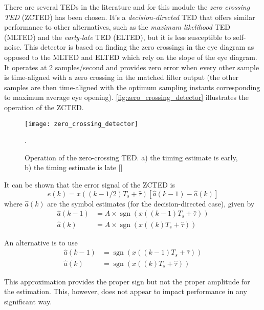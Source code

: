 There are several TEDs in the literature and for this module the \emph{zero crossing TED} (ZCTED) has been chosen. It's a \emph{decision-directed} TED that offers similar performance to other alternatives, such as the \emph{maximum likelihood} TED (MLTED) and the \emph{early-late} TED (ELTED), but it is less susceptible to self-noise. This detector is based on finding the zero crossings in the eye diagram as opposed to the MLTED and ELTED which rely on the slope of the eye diagram. It operates at 2 samples/second and provides zero error when every other sample is time-aligned with a zero crossing in the matched filter output (the other samples are then time-aligned with the optimum sampling instants corresponding to maximum average eye opening). \autoref{fig:zero_crossing_detector} illustrates the operation of the ZCTED.

\begin{figure}[ht]
  \centering
  \texttt{[image: zero\_crossing\_detector]}
  \caption{Operation of the zero-crossing TED. a) the timing estimate is early, b) the timing estimate is late [\citeauthor{digcomm_discrete_approach}]}.
  \label{fig:zero_crossing_detector}
\end{figure}

It can be shown \cite{digcomm_discrete_approach} that the error signal of the ZCTED is
\begin{equation}
e(k) = x\left(\left(k-1/2\right)T_s+\hat\tau\right)\left[\hat a\left(k-1\right)-\hat a\left(k\right)\right]
\end{equation}
where $\hat a(k)$ are the symbol estimates (for the decision-directed case), given by
\begin{align}
\hat a(k-1) &= A\times\operatorname{sgn}\left(x\left(\left(k-1\right)T_s + \hat\tau\right)\right)\\
\hat a(k)   &= A\times\operatorname{sgn}\left(x\left(\left(k\right)T_s + \hat\tau\right)\right)
\end{align}

An alternative is to use
\begin{align}
\hat a(k-1) &= \operatorname{sgn}\left(x\left(\left(k-1\right)T_s + \hat\tau\right)\right)\\
\hat a(k)   &= \operatorname{sgn}\left(x\left(\left(k\right)T_s + \hat\tau\right)\right)
\end{align}

This approximation provides the proper sign but not the proper amplitude for the estimation. This, however, does not appear to impact performance in any significant way.

